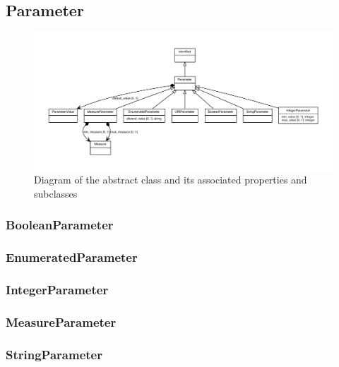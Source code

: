 \subsection{Parameter}
\label{sec:Parameter}

\begin{figure}[ht]
\begin{center}
\includegraphics[scale=0.6]{figures/Parameter_definition_and_abstraction}
\caption[]{Diagram of the  abstract class and its associated properties and subclasses}
\label{uml:Parameter}
\end{center}
\end{figure}

\subsubsection{BooleanParameter}
\label{sec:BooleanParameter}

\subsubsection{EnumeratedParameter}
\label{sec:EnumeratedParameter}

\subsubsection{IntegerParameter}
\label{sec:IntegerParameter}

\subsubsection{MeasureParameter}
\label{sec:MeasureParameter}

\subsubsection{StringParameter}
\label{sec:StringParameter}

